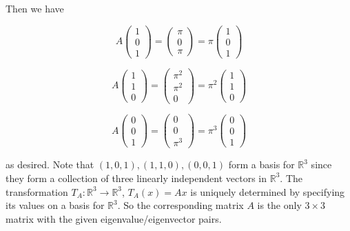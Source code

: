 \documentclass[11pt]{article}
\begin{document}
Then we have

$$A \begin{pmatrix} 1\\0\\1 \end{pmatrix} =  \begin{pmatrix} \pi\\0\\\pi \end{pmatrix} = \pi \begin{pmatrix} 1\\0\\1 \end{pmatrix}$$

$$A \begin{pmatrix} 1\\1\\0 \end{pmatrix} =  \begin{pmatrix} \pi^2\\\pi^2\\0 \end{pmatrix} = \pi^2 \begin{pmatrix} 1\\1\\0 \end{pmatrix}$$

$$A \begin{pmatrix} 0\\0\\1 \end{pmatrix} =  \begin{pmatrix} 0\\0\\\pi^3 \end{pmatrix} = \pi^3 \begin{pmatrix} 0\\0\\1 \end{pmatrix}$$

as desired. Note that $(1,0,1), (1,1,0), (0,0,1)$ form a basis for $\mathbb{R}^3$ since they form a collection of three linearly independent vectors in $\mathbb{R}^3$. The transformation $T_A : \mathbb{R}^3 \rightarrow \mathbb{R}^3$, $T_A(x) = Ax$ is uniquely determined by specifying its values on a basis for $\mathbb{R}^3$. So the corresponding matrix $A$ is the only $3\times 3$ matrix with the given eigenvalue/eigenvector pairs. 
\end{document}
